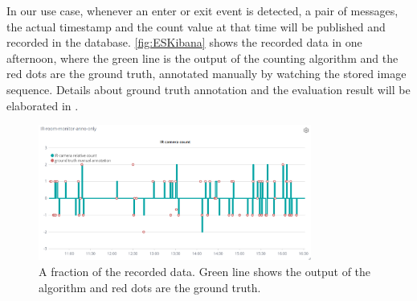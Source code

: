 In our use case, whenever an enter or exit event is detected, a pair of messages, the actual timestamp and the count value at that time will be published and recorded in the database. \autoref{fig:ESKibana} shows the recorded data in one afternoon, where the green line is the output of the counting algorithm and the red dots are the ground truth, annotated manually by watching the stored image sequence. Details about ground truth annotation and the evaluation result will be elaborated in .
\begin{figure}
  \centering
  \includegraphics[width=0.8\textwidth]{figures/ESKibana_overview.PNG}
  \caption{A fraction of the recorded data. Green line shows the output of the algorithm and red dots are the ground truth.}\label{fig:ESKibana}
\end{figure}


